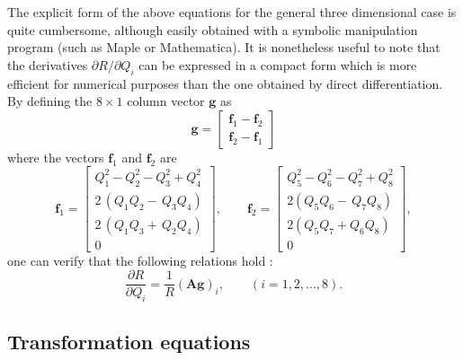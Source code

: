 \documentclass[thmsa]{article}
\begin{document}
The explicit form of the above equations for the general three dimensional
case is quite cumbersome, although easily obtained with a symbolic
manipulation program (such as Maple or Mathematica). It is nonetheless
useful to note that the derivatives $\partial R/\partial Q_i$ can be
expressed in a compact form which is more efficient for numerical purposes
than the one obtained by direct differentiation. By defining the $8\times 1$
column vector $\mathbf{g}$ as 
\begin{equation}
\mathbf{g}=\left[ 
\begin{array}{c}
\mathbf{f}_1-\mathbf{f}_2 \\ 
\mathbf{f}_2-\mathbf{f}_1
\end{array}
\right]  \label{e18}
\end{equation}
where the vectors $\mathbf{f}_1$ and $\mathbf{f}_2$ are 
\begin{equation}
\mathbf{f}_1=\left[ 
\begin{array}{c}
Q_1^2-Q_2^2-Q_3^2+Q_4^2 \\ 
2\,(Q_1Q_2-\,Q_3Q_4) \\ 
2\,(Q_1Q_3+\,Q_2Q_4) \\ 
0
\end{array}
\right] ,\quad \quad \mathbf{f}_2=\left[ 
\begin{array}{c}
Q_5^2-Q_6^2-Q_7^2+Q_8^2 \\ 
2(Q_5Q_6-\,Q_7Q_8) \\ 
2(Q_5Q_7+Q_6Q_8) \\ 
0
\end{array}
\right] ,  \label{e16}
\end{equation}
one can verify that the following relations hold \cite{Perez}: 
\begin{equation}
\frac{\partial R}{\partial Q_i}=\frac 1R(\mathbf{Ag})_i,\qquad (i=1,2,\ldots
,8).  \label{e20}
\end{equation}

\subsection{Transformation equations}
\end{document}
